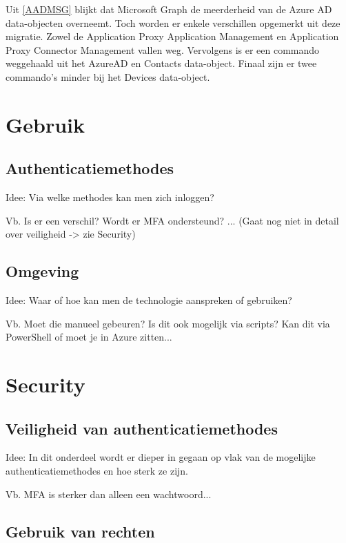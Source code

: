 Uit \ref{AADMSG} blijkt dat Microsoft Graph de meerderheid van de Azure \ac{AD} data-objecten overneemt. Toch worden er enkele verschillen opgemerkt uit deze migratie. Zowel de Application Proxy Application Management en Application Proxy Connector Management vallen weg. Vervolgens is er een commando weggehaald uit het AzureAD en Contacts data-object. Finaal zijn er twee commando's minder bij het Devices data-object. \\


\section{Gebruik}

\subsection{Authenticatiemethodes}

Idee: Via welke methodes kan men zich inloggen? 

Vb. Is er een verschil? Wordt er MFA ondersteund? ... (Gaat nog niet in detail over veiligheid -> zie Security)

\subsection{Omgeving}

Idee: Waar of hoe kan men de technologie aanspreken of gebruiken?

Vb. Moet die manueel gebeuren? Is dit ook mogelijk via scripts? Kan dit via PowerShell of moet je in Azure zitten...






\section{Security}

\subsection{Veiligheid van authenticatiemethodes}

Idee: In dit onderdeel wordt er dieper in gegaan op vlak van de mogelijke authenticatiemethodes en hoe sterk ze zijn.

Vb. MFA is sterker dan alleen een wachtwoord...

\subsection{Gebruik van rechten}




